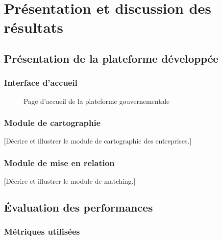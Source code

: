 \documentclass[12pt, a4paper, oneside]{report}
\begin{document}
\chapter{Présentation et discussion des résultats}
\label{chap:resultats}

\section{Présentation de la plateforme développée}
\label{sec:plateforme}

\subsection{Interface d'accueil}

\begin{figure}[H]
  \centering
  \caption{Page d'accueil de la plateforme gouvernementale}
  \label{fig:accueil}
\end{figure}

\subsection{Module de cartographie}

[Décrire et illustrer le module de cartographie des entreprises.]

\subsection{Module de mise en relation}

[Décrire et illustrer le module de matching.]

\section{Évaluation des performances}
\label{sec:evaluation}

\subsection{Métriques utilisées}
\end{document}
